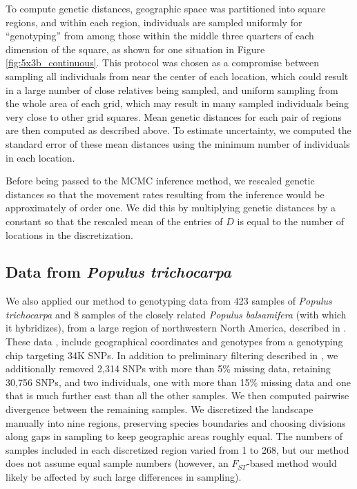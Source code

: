 \documentclass{article}
\begin{document}
To compute genetic distances,
geographic space was partitioned into square regions,
and within each region, 
individuals are sampled uniformly for ``genotyping'' 
from among those within the middle three quarters of each dimension of the square,
as shown for one situation in Figure \ref{fig:5x3b_continuous}.
This protocol was chosen as a compromise between sampling all individuals 
from near the center of each location,
which could result in a large number of close relatives being sampled,
and uniform sampling from the whole area of each grid, 
which may result in many sampled individuals being very close to other grid squares.
Mean genetic distances for each pair of regions are then computed as described above.
To estimate uncertainty, we computed the standard error of these mean distances
using the minimum number of individuals in each location.

Before being passed to the MCMC inference method,
we rescaled genetic distances so that the movement rates resulting from the inference
would be approximately of order one.
We did this by multiplying genetic distances by a constant
so that the rescaled mean of the entries of $D$
is equal to the number of locations in the discretization. 

\subsection*{Data from \textit{Populus trichocarpa}}

We also applied our method to genotyping data from 423 samples of \textit{Populus trichocarpa}
and 8 samples of the closely related \textit{Populus balsamifera} (with which it hybridizes),
from a large region of northwestern North America,
described in \citet{geraldes2014landscape}.
These data \citep{geraldes2014data},
include geographical coordinates and genotypes from a genotyping chip targeting 34K SNPs.
In addition to preliminary filtering described in \citet{geraldes2014landscape},
we additionally removed 2,314 SNPs with more than 5\% missing data, retaining 30,756 SNPs,
and two individuals, one with more than 15\% missing data and one that is much further east
than all the other samples.
We then computed pairwise divergence between the remaining samples.
We discretized the landscape manually into nine regions,
preserving species boundaries and choosing divisions along gaps in sampling
to keep geographic areas roughly equal.
The numbers of samples included in each discretized region varied from 1 to 268,
but our method does not assume equal sample numbers
(however, an $F_{ST}$-based method would likely be affected by such large differences in sampling).
\end{document}
